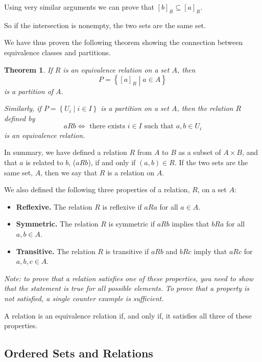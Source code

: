 \documentclass[
]{book}
\providecommand{\tightlist}{%
  \setlength{\itemsep}{0pt}\setlength{\parskip}{0pt}}
\newtheorem{theorem}{Theorem}[chapter]
\theoremstyle{definition}
\theoremstyle{definition}
\theoremstyle{definition}
\theoremstyle{definition}
\theoremstyle{remark}
\begin{document}
Using very similar arguments we can prove that \([b]_R \subseteq [a]_R\).

So if the intersection is nonempty, the two sets are the same set.

We have thus proven the following theorem showing the connection between equivalence classes and partitions.

\begin{theorem}
If \(R\) is an equivalence relation on a set \(A\), then \[P = \left\{ [a]_R \middle \vert a \in A\right\}\] is a partition of \(A\).

Similarly, if \(P= \left\{ U_i \middle \vert i \in I\right\}\) is a partition on a set \(A\), then the relation \(R\) defined by
\[aRb \Leftrightarrow \mbox{ there exists } i \in I \mbox{ such that } a,b \in U_i\] is an equivalence relation.
\end{theorem}

In summary, we have defined a relation \(R\) from \(A\) to \(B\) as a subset of \(A\times B\), and that \(a\) is related to \(b\), (\(aRb\)), if and only if \((a,b)\in R\). If the two sets are the same set, \(A\), then we say that \(R\) is a relation on \(A\).

We also defined the following three properties of a relation, \(R\), on a set \(A\):

\begin{itemize}
\tightlist
\item
  \textbf{Reflexive.} The relation \(R\) is reflexive if \(aRa\) for all \(a\in A\).
\item
  \textbf{Symmetric.} The relation \(R\) is symmetric if \(aRb\) implies that \(bRa\) for all \(a,b\in A\).
\item
  \textbf{Transitive.} The relation \(R\) is transitive if \(aRb\) and \(bRc\) imply that \(aRc\) for \(a,b,c\in A\).
\end{itemize}

\emph{Note: to prove that a relation satisfies one of these properties, you need to show that the statement is true for all possible elements. To prove that a property is not satisfied, a single counter example is sufficient.}

A relation is an equivalence relation if, and only if, it satisfies all three of these properties.

\hypertarget{ordered-sets-and-relations}{%
\subsection{Ordered Sets and Relations}\label{ordered-sets-and-relations}}
\end{document}
